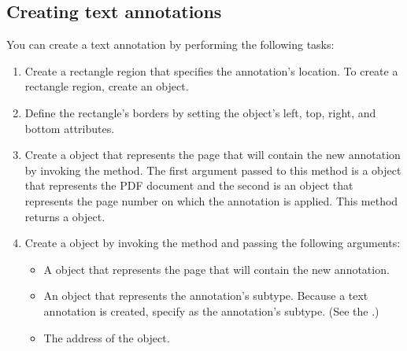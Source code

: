 \documentclass[letterpaper,12pt,english,openany,oneside]{sphinxmanual}
\begin{document}
\subsection{Creating text annotations}
\label{\detokenize{Plugins_Annotations:creating-text-annotations}}
You can create a text annotation by performing the following tasks:
\begin{enumerate}
%
\item {} 
Create a rectangle region that specifies the annotation’s location. To create a rectangle region, create an  object.

\item {} 
Define the rectangle’s borders by setting the  object’s left, top, right, and bottom attributes.

\item {} 
Create a  object that represents the page that will contain the new annotation by invoking the  method. The first argument passed to this method is a  object that represents the PDF document and the second is an  object that represents the page number on which the annotation is applied. This method returns a  object.

\item {} 
Create a  object by invoking the  method and passing the following arguments:
\begin{itemize}
\item {} 
A  object that represents the page that will contain the new annotation.

\item {} 
An  object that represents the annotation’s subtype. Because a text annotation is created, specify  as the annotation’s subtype. (See the .)

\item {} 
The address of the  object.

\end{itemize}

\end{enumerate}
\end{document}
